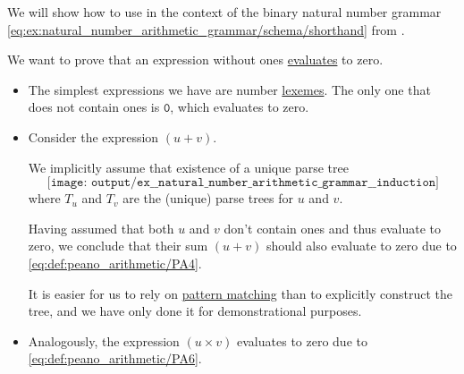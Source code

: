 \begin{example}\label{ex:natural_number_arithmetic_grammar/induction}
  We will show how to use  in the context of the binary natural number grammar \eqref{eq:ex:natural_number_arithmetic_grammar/schema/shorthand} from .

  We want to prove that an expression without ones \hyperref[rem:evaluation]{evaluates} to zero.

  \begin{itemize}
    \item The simplest expressions we have are number \hyperref[rem:abstract_syntax_tree/lexical]{lexemes}. The only one that does not contain ones is \( \mathtt{0} \), which evaluates to zero.

    \item Consider the expression \( (u + v) \).

    We implicitly assume that existence of a unique parse tree
    \begin{equation*}
      \texttt{[image: output/ex\_\_natural\_number\_arithmetic\_grammar\_\_induction]}
    \end{equation*}
    where \( T_u \) and \( T_v \) are the (unique) parse trees for \( u \) and \( v \).

    Having assumed that both \( u \) and \( v \) don't contain ones and thus evaluate to zero, we conclude that their sum \( (u + v) \) should also evaluate to zero due to \ref{eq:def:peano_arithmetic/PA4}.

    It is easier for us to rely on \hyperref[rem:evaluation]{pattern matching} than to explicitly construct the tree, and we have only done it for demonstrational purposes.

    \item Analogously, the expression \( (u \times v) \) evaluates to zero due to \ref{eq:def:peano_arithmetic/PA6}.
  \end{itemize}
\end{example}
